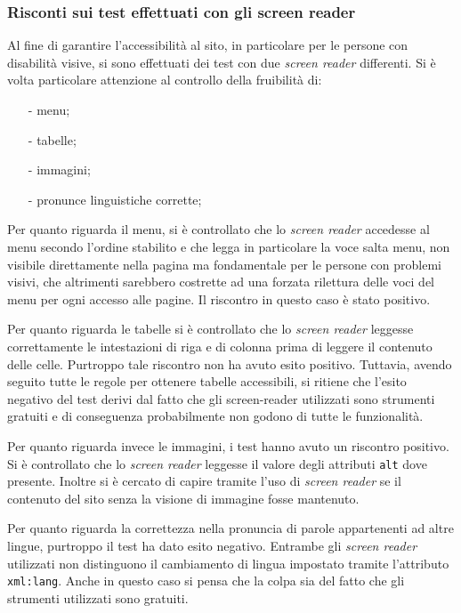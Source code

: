 \documentclass[10pt,a4paper,onecolumn]{article}
\newcommand{\inglese}[1]{\foreignlanguage{english}{\itshape{}#1}}
\begin{document}
\subsubsection{Risconti sui test effettuati con gli screen reader}
Al fine di garantire l'accessibilità al sito, in particolare per le persone con disabilità visive, si sono effettuati dei test con due  \inglese{screen reader} differenti. 
Si è volta particolare attenzione al controllo della fruibilità di:
\begin{itemize}[noitemsep,nolistsep]
  \item[-] menu;
  \item[-] tabelle;
  \item[-] immagini;
  \item[-] pronunce linguistiche corrette;
\end{itemize}

Per quanto riguarda il menu, si è controllato che lo \inglese{screen reader} accedesse al menu secondo l'ordine stabilito e che legga in particolare la voce salta menu, non visibile direttamente nella pagina ma fondamentale per le persone con problemi visivi, che altrimenti sarebbero costrette ad una forzata rilettura delle voci del menu per ogni accesso alle pagine. Il riscontro in questo caso è stato positivo.

Per quanto riguarda le tabelle si è controllato che lo \inglese{screen reader} leggesse correttamente le intestazioni di riga e di colonna prima di leggere il contenuto delle celle. Purtroppo tale riscontro non ha avuto esito positivo. Tuttavia, avendo seguito tutte le regole per ottenere tabelle accessibili, si ritiene che l'esito negativo del test derivi dal fatto che gli screen-reader utilizzati sono strumenti gratuiti e di conseguenza probabilmente non godono di tutte le funzionalità.

Per quanto riguarda invece le immagini, i test hanno avuto un riscontro positivo. Si è controllato che lo \inglese{screen reader} leggesse il valore degli attributi \texttt{alt} dove presente. Inoltre si è cercato di capire tramite l'uso di \inglese{screen reader} se il contenuto del sito senza la visione di immagine fosse mantenuto.

Per quanto riguarda la correttezza nella pronuncia di parole appartenenti ad altre lingue, purtroppo il test ha dato esito negativo. Entrambe gli \inglese{screen reader} utilizzati non distinguono il cambiamento di lingua impostato tramite l'attributo  \texttt{xml:lang}.  Anche in questo caso si pensa che la colpa sia del fatto che gli strumenti utilizzati sono gratuiti.
\end{document}
